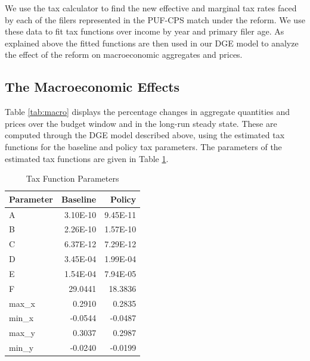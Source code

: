 \documentclass[letterpaper,12pt]{article}
\theoremstyle{definition}
\begin{document}
\begin{spacing}{1.5}
We use the tax calculator to find the new effective and marginal tax rates faced by each of the filers represented in the PUF-CPS match under the reform.  We use these data to fit tax functions over income by year and primary filer age.  As explained above the fitted functions are then used in our DGE model to analyze the effect of the reform on macroeconomic aggregates and prices.

  \subsection{The Macroeconomic Effects}

    Table \ref{tab:macro} displays the percentage changes in aggregate quantities and prices over the budget window and in the long-run steady state.  These are computed through the DGE model described above, using the estimated tax functions for the baseline and policy tax parameters.  The parameters of the estimated tax functions are given in Table \ref{tab:tax_params}.

    \begin{table}[htbp]
      \centering
      \caption{Tax Function Parameters}
        \begin{tabular}{lrr}
        \hline
        \hline
        Parameter & Baseline & Policy \\
        \hline
        A     & 3.10E-10 & 9.45E-11 \\
        B     & 2.26E-10 & 1.57E-10 \\
        C     & 6.37E-12 & 7.29E-12 \\
        D     & 3.45E-04 & 1.99E-04 \\
        E     & 1.54E-04 & 7.94E-05 \\
        F     & 29.0441 & 18.3836 \\
        max\_{x} & 0.2910 & 0.2835 \\
        min\_{x} & -0.0544 & -0.0487 \\
        max\_{y} & 0.3037 & 0.2987 \\
        min\_{y} & -0.0240 & -0.0199 \\
        \hline
        \hline
        \end{tabular}%
      \label{tab:tax_params}%
    \end{table}%



\end{spacing}
\end{document}
